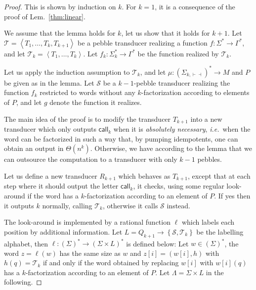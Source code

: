 \documentclass{article}
\newcommand{\set}[1]{\left\{#1 \right\}}
\newcommand{\atuple}[1]{\left\langle #1 \right\rangle}
\newcommand{\Ss}{\mathcal S}
\newcommand{\Tt}{\mathcal T}
\newcommand{\call}{\mathsf {call}}
\theoremstyle{definition}
\theoremstyle{remark}
\begin{document}
\begin{proof}
    This is shown by induction on $k$.
    For $k=1$, it is a consequence of the proof of Lem.~\ref{thm:linear}.

    We assume that the lemma holds for $k$, let us show that it holds for $k+1$.
    Let $\Tt=\atuple{T_1,\ldots,T_k,T_{k+1}}$ be a pebble transducer realizing a function $f:\Sigma^*\to\Gamma^*$, and let $\Tt_k=\atuple{T_1,\ldots,T_k}$. Let $f_k:\Sigma_k^*\to \Gamma^*$ be the function realized by $\Tt_k$.

    Let us apply the induction assumption to $\Tt_k$, and let $\mu:(\Sigma_{k,\vdash\dashv})^*\to M$ and $P$ be given as in the lemma. Let $\Ss$ be a $k{-}1$-pebble transducer realizing the function $f_k$ restricted to words without any $k$-factorization according to elements of $P$, and let $g$ denote the function it realizes.

    The main idea of the proof is to modify the transducer $T_{k+1}$ into a new transducer which only outputs $\call_k$ when it is \emph{absolutely necessary}, \textit{i.e.}~when the word can be factorized in such a way that, by pumping idempotents, one can obtain an output in $\Theta(n^k)$.
    Otherwise, we have according to the lemma that we can outsource the computation to a transducer with only $k-1$ pebbles.

    Let us define a new transducer $R_{k+1}$ which behaves as $T_{k+1}$, except that at each step where it should output the letter $\call_k$, it checks, using some regular look-around if the word has a $k$-factorization according to an element of $P$. If yes then it outputs $k$ normally, calling $\Tt_k$, otherwise it calls $\Ss$ instead.

    The look-around is implemented by a rational function $\ell$ which labels each position by additional information.
    Let $L=Q_{k+1}\to \set{\Ss,\Tt_k}$ be the labelling alphabet, then $\ell:(\Sigma)^*\to (\Sigma\times L)^*$ is defined below:
    Let $w\in (\Sigma)^*$, the word $z=\ell(w)$ has the same size as $w$ and $z[i]=(w[i],h)$ with $h(q)=\Tt_k$ if and only if the word obtained by replacing $w[i]$ with $w[i](q)$ has a $k$-factorization according to an element of $P$.
    Let $\Lambda=\Sigma\times L$ in the following.



\end{proof}
\end{document}
